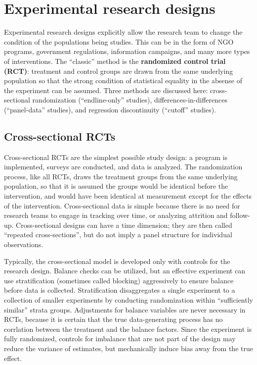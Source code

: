 \section{Experimental research designs}

Experimental research designs explicitly allow the research team
to change the condition of the populations being studies.
This can be in the form of NGO programs, government regulations,
information campaigns, and many more types of interventions.
The ``classic'' method is the \textbf{randomized control trial (RCT)}:
treatment and control groups are drawn from the same underlying population
so that the strong condition of statistical equality
in the absense of the experiment can be assumed.
Three methods are discussed here:
cross-sectional randomization (``endline-only'' studies),
differences-in-differences (``panel-data'' studies),
and regression discontinuity (``cutoff'' studies).

\subsection{Cross-sectional RCTs}

Cross-sectional RCTs are the simplest possible study design:
a program is implemented, surveys are conducted, and data is analyzed.
The randomization process, like all RCTs,
draws the treatment groups from the same underlying population,
so that it is assumed the groups would be identical
before the intervention, and would have been identical at measurement
except for the effects of the intervention.
Cross-sectional data is simple because there is no need
for research teams to engage in tracking over time,
or analyzing attrition and follow-up.
Cross-sectional designs can have a time dimension;
they are then called ``repeated cross-sections'',
but do not imply a panel structure for individual observations.

Typically, the cross-sectional model is developed
only with controls for the research design.
Balance checks can be utilized, but an effective experiment
can use stratification (sometimes called blocking) aggressively to ensure balance
before data is collected.\cite{athey2017econometrics}
Stratification disaggregates a single experiment to a collection
of smaller experiments by conducting randomization within
``sufficiently similar'' strata groups.
Adjustments for balance variables are never necessary in RCTs,
because it is certain that the true data-generating process
has no corrlation between the treatment and the balance factors.
Since the experiment is fully randomized,
controls for imbalance that are not part of the design
may reduce the variance of estimates,
but mechanically induce bias away from the true effect.

